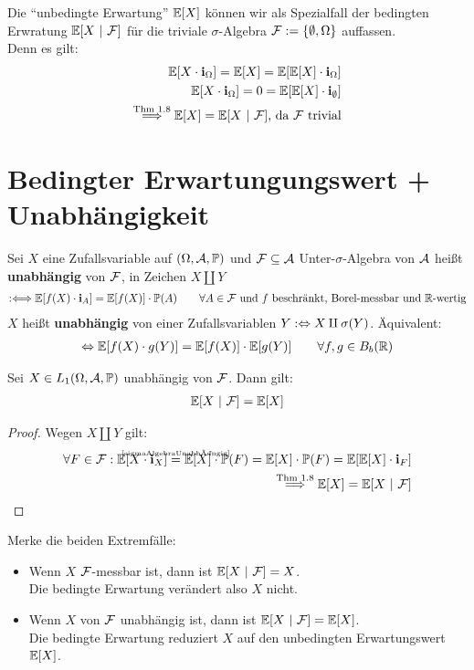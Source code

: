 \begin{bemerkung}
Die ``unbedingte Erwartung'' $\mathbb{E}[X]$ können wir als Spezialfall der bedingten Erwratung $\mathbb{E}[X~|~\mathcal{F}]$ für die triviale $\sigma$-Algebra $\mathcal{F}:=\lbrace\emptyset,\Omega\rbrace$ auffassen.\\
Denn es gilt:
\begin{align*}
\mathbb{E}[X\cdot\textbf{i}_\Omega]=\mathbb{E}[X]=\mathbb{E}[\mathbb{E}[X]\cdot\textbf{i}_\Omega]\\
\mathbb{E}[X\cdot\textbf{i}_\Omega]=0=\mathbb{E}[\mathbb{E}[X]\cdot\textbf{i}_\emptyset]\\
\stackrel{\text{Thm 1.8}}{\Longrightarrow}
\mathbb{E}[X]=\mathbb{E}[X~|~\mathcal{F}]\text{, da $\mathcal{F}$ trivial}
\end{align*}
\end{bemerkung}

\section{Bedingter Erwartungungswert + Unabhängigkeit} %
Sei $X$ eine Zufallsvariable auf $(\Omega,\mathcal{A},\mathbb{P})$ und $\mathcal{F}\subseteq\mathcal{A}$ Unter-$\sigma$-Algebra von $\mathcal{A}$ heißt \textbf{unabhängig} von $\mathcal{F}$, in Zeichen $X\amalg Y$
\begin{align}\label{sigmaAlgebraUnabhängig}
:\Longleftrightarrow
\mathbb{E}[f(X)\cdot\textbf{i}_A]
=
\mathbb{E}[f(X)]\cdot\mathbb{P}(A)\qquad\forall A\in\mathcal{F}\text{ und $f$ beschränkt, Borel-messbar und $\mathbb{R}$-wertig}
\end{align}
$X$ heißt \textbf{unabhängig} von einer Zufallsvariablen $Y:\Leftrightarrow X\amalg\sigma(Y)$. Äquivalent:
\begin{align*}
\Leftrightarrow\mathbb{E}[f(X)\cdot g(Y)]
=
\mathbb{E}[f(X)]\cdot\mathbb{E}[g(Y)]\qquad\forall f,g\in B_b(\mathbb{R})
\end{align*}

\begin{theorem} %
Sei $X\in L_1(\Omega,\mathcal{A},\mathbb{P})$ unabhängig von $\mathcal{F}$. Dann gilt:
\begin{align*}
\mathbb{E}[X~|~\mathcal{F}]=\mathbb{E}[X]
\end{align*}
\end{theorem}

\begin{proof}
Wegen $X\amalg Y$ gilt:
\begin{align*}
\forall F\in\F:\E[X\cdot\indi_X]
\stackeq{\ref{sigmaAlgebraUnabhängig}}
\E[X]\cdot\P(F)=\E[X]\cdot\P(F)=\E[\E[X]\cdot\indi_F]\\
\stackrel{\text{Thm 1.8}}{\Longrightarrow}
\E[X]=\E[X~|~\F]
\end{align*}
\end{proof}

\begin{bemerkung}
Merke die beiden Extremfälle:
\begin{itemize}
\item Wenn $X$ $\mathcal{F}$-messbar ist, dann ist $\mathbb{E}[X~|~\mathcal{F}]=X$.\\
Die bedingte Erwartung verändert also $X$ nicht.
\item Wenn $X$ von $\mathcal{F}$ unabhängig ist, dann ist $\mathbb{E}[X~|~\mathcal{F}]=\mathbb{E}[X]$.\\
Die bedingte Erwartung reduziert $X$ auf den unbedingten Erwartungswert $\mathbb{E}[X]$.
\end{itemize}
\end{bemerkung}
